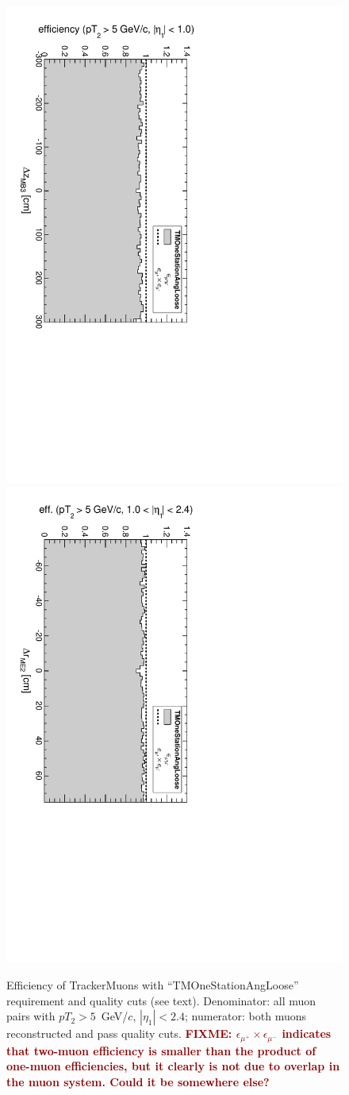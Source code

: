 \documentclass[12pt]{article}
\newcommand{\fixme}[1]{\textcolor{darkred}{\bf FIXME: #1}}
\begin{document}
\begin{figure}
\includegraphics[height=0.5\linewidth, angle=90]{fig/acceptance8_plot/vsmb3dz_TMOneStationAngLoose.pdf}
\includegraphics[height=0.5\linewidth, angle=90]{fig/acceptance8_plot/vsme2dr_TMOneStationAngLoose.pdf}

\caption{Efficiency of TrackerMuons with ``TMOneStationAngLoose'' requirement and quality cuts (see text).  Denominator: all muon pairs with $pT_2 > 5$~GeV/$c$, $|\eta_1| < 2.4$; numerator: both muons reconstructed and pass quality cuts. \fixme{$\epsilon_{\mu^+} \times \epsilon_{\mu^-}$ indicates that two-muon efficiency is smaller than the product of one-muon efficiencies, but it clearly is not due to overlap in the muon system.  Could it be somewhere else?} \label{fig:efficiencies_TMOneStationAngLoose}}
\end{figure}
\end{document}
